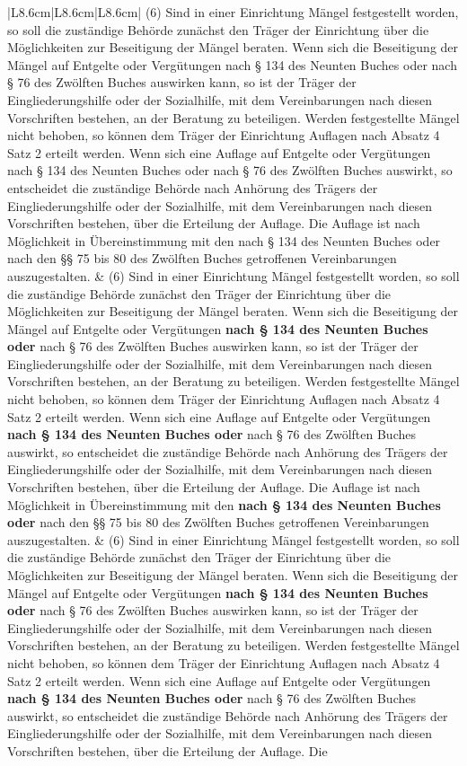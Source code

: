 \documentclass[10pt,a4paper,landscape]{article}
\begin{document}
\begin{longtable}{|L{8.6cm}|L{8.6cm}|L{8.6cm}|}
(6) Sind in einer Einrichtung Mängel festgestellt worden, so soll die zuständige Behörde zunächst den Träger der Einrichtung über die Möglichkeiten zur Beseitigung der Mängel beraten. Wenn sich die Beseitigung der Mängel auf Entgelte oder Vergütungen nach \S{} 134 des Neunten Buches oder nach \S{} 76 des Zwölften Buches auswirken kann, so ist der Träger der Eingliederungshilfe oder der Sozialhilfe, mit dem Vereinbarungen nach diesen Vorschriften bestehen, an der Beratung zu beteiligen. Werden festgestellte Mängel nicht behoben, so können dem Träger der Einrichtung Auflagen nach Absatz 4 Satz 2 erteilt werden. Wenn sich eine Auflage auf Entgelte oder Vergütungen nach \S{} 134 des Neunten Buches oder nach \S{} 76 des Zwölften Buches auswirkt, so entscheidet die zuständige Behörde nach Anhörung des Trägers der Eingliederungshilfe oder der Sozialhilfe, mit dem Vereinbarungen nach diesen Vorschriften bestehen, über die Erteilung der Auflage. Die Auflage ist nach Möglichkeit in Übereinstimmung mit den nach \S{} 134 des Neunten Buches oder nach den \S{}\S{} 75 bis 80 des Zwölften Buches getroffenen Vereinbarungen auszugestalten. & (6) Sind in einer Einrichtung Mängel festgestellt worden, so soll die zuständige Behörde zunächst den Träger der Einrichtung über die Möglichkeiten zur Beseitigung der Mängel beraten. Wenn sich die Beseitigung der Mängel auf Entgelte oder Vergütungen \textbf{nach \S{} 134 des Neunten Buches oder }nach \S{} 76 des Zwölften Buches auswirken kann, so ist der Träger der Eingliederungshilfe oder der Sozialhilfe, mit dem Vereinbarungen nach diesen Vorschriften bestehen, an der Beratung zu beteiligen. Werden festgestellte Mängel nicht behoben, so können dem Träger der Einrichtung Auflagen nach Absatz 4 Satz 2 erteilt werden. Wenn sich eine Auflage auf Entgelte oder Vergütungen \textbf{nach \S{} 134 des Neunten Buches oder }nach \S{} 76 des Zwölften Buches auswirkt, so entscheidet die zuständige Behörde nach Anhörung des Trägers der Eingliederungshilfe oder der Sozialhilfe, mit dem Vereinbarungen nach diesen Vorschriften bestehen, über die Erteilung der Auflage. Die Auflage ist nach Möglichkeit in Übereinstimmung mit den \textbf{nach \S{} 134 des Neunten Buches oder} nach den \S{}\S{} 75 bis 80 des Zwölften Buches getroffenen Vereinbarungen auszugestalten. & (6) Sind in einer Einrichtung Mängel festgestellt worden, so soll die zuständige Behörde zunächst den Träger der Einrichtung über die Möglichkeiten zur Beseitigung der Mängel beraten. Wenn sich die Beseitigung der Mängel auf Entgelte oder Vergütungen \textbf{nach \S{} 134 des Neunten Buches oder }nach \S{} 76 des Zwölften Buches auswirken kann, so ist der Träger der Eingliederungshilfe oder der Sozialhilfe, mit dem Vereinbarungen nach diesen Vorschriften bestehen, an der Beratung zu beteiligen. Werden festgestellte Mängel nicht behoben, so können dem Träger der Einrichtung Auflagen nach Absatz 4 Satz 2 erteilt werden. Wenn sich eine Auflage auf Entgelte oder Vergütungen \textbf{nach \S{} 134 des Neunten Buches oder }nach \S{} 76 des Zwölften Buches auswirkt, so entscheidet die zuständige Behörde nach Anhörung des Trägers der Eingliederungshilfe oder der Sozialhilfe, mit dem Vereinbarungen nach diesen Vorschriften bestehen, über die Erteilung der Auflage. Die 
\end{longtable}
\end{document}
